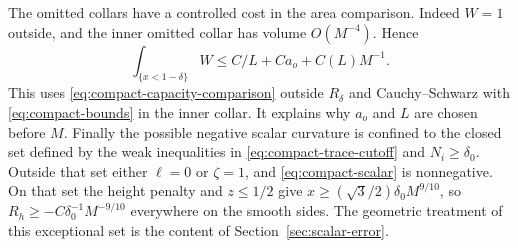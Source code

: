 The omitted collars have a controlled cost in the area comparison.
Indeed $W=1$ outside, and the inner omitted collar has volume
$O(M^{-4})$. Hence
\begin{equation}\label{eq:compact-full-bad-volume}
 \int_{\{x<1-\delta\}}W
 \le C/L+C a_o+C(L)M^{-1}.
\end{equation}
This uses \eqref{eq:compact-capacity-comparison} outside $R_\delta$
and Cauchy--Schwarz with \eqref{eq:compact-bounds} in the inner
collar. It explains why $a_o$ and $L$ are chosen before $M$.
Finally the possible negative scalar curvature is confined to the
closed set defined by the weak inequalities in
\eqref{eq:compact-trace-cutoff} and $N_i\ge\delta_0$.
Outside that set either $\ell=0$ or $\zeta=1$, and
\eqref{eq:compact-scalar} is nonnegative. On that set the height
penalty and $z\le1/2$ give
$x\ge(\sqrt3/2)\delta_0M^{9/10}$, so
$R_h\ge-C\delta_0^{-1}M^{-9/10}$ everywhere on the smooth sides.
The geometric treatment of this exceptional set is the content of
Section~\ref{sec:scalar-error}.
